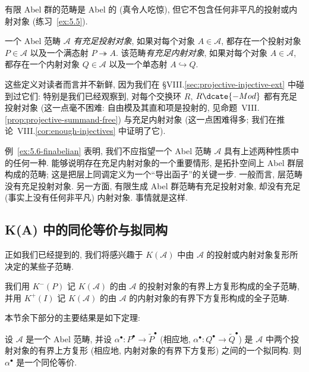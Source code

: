 \begin{example}\label{ex:5.6-finabelian}
有限 Abel 群的范畴是 Abel 的 (真令人吃惊), 但它不包含任何非平凡的投射或内射对象 (练习~\ref{ex:5.5}).
\end{example}

\begin{definition}\label{def:5.7-enough}
一个 Abel 范畴 $\mathcal{A}$ \emph{有充足投射对象}, 如果对每个对象 $A\in\mathcal{A}$, 都存在一个投射对象 $P\in\mathcal{A}$ 以及一个满态射 $P\twoheadrightarrow A$. 该范畴\emph{有充足内射对象}, 如果对每个对象 $A\in\mathcal{A}$, 都存在一个内射对象 $Q\in\mathcal{A}$ 以及一个单态射 $A\hookrightarrow Q$.
\end{definition}

\indent 这些定义对读者而言并不新鲜, 因为我们在 §VIII.\ref{sec:projective-injective-ext} 中碰到过它们: 特别是我们已经观察到, 对每个交换环 $R$, $R\dcate{-Mod}$ 都有充足投射对象 (这一点毫不困难: 自由模及其直和项是投射的, 见命题~VIII.\ref{prop:projective-summand-free}) 与充足内射对象 (这一点困难得多; 我们在推论~VIII.\ref{cor:enough-injectives} 中证明了它).

\indent 例~\ref{ex:5.6-finabelian} 表明, 我们不应指望一个 Abel 范畴 $\mathcal{A}$ 具有上述两种性质中的任何一种. 能够说明存在充足内射对象的一个重要情形, 是拓扑空间上 Abel 群层构成的范畴; 这是把层上同调定义为一个``导出函子''的关键一步. 一般而言, 层范畴没有充足投射对象. 另一方面, 有限生成 Abel 群范畴有充足投射对象, 却没有充足 (事实上没有任何非平凡) 内射对象. 事情就是这样.

\subsection{K(A) 中的同伦等价与拟同构}
\label{subsec:5.4-homotopy-quasi}

正如我们已经提到的, 我们将感兴趣于 $K(\mathcal{A})$ 中由 $\mathcal{A}$ 的投射或内射对象复形所决定的某些子范畴.

\begin{definition}\label{def:5.8-KP-KI}
我们用 $K^-(P)$ 记 $K(\mathcal{A})$ 的由 $\mathcal{A}$ 的投射对象的有界上方复形构成的全子范畴, 并用 $K^+(I)$ 记 $K(\mathcal{A})$ 的由 $\mathcal{A}$ 的内射对象的有界下方复形构成的全子范畴.
\end{definition}

\indent 本节余下部分的主要结果是如下定理:

\begin{theorem}\label{thm:5.9-quasi-is-homotopy-equiv}
设 $\mathcal{A}$ 是一个 Abel 范畴, 并设 $\alpha^\bullet:P^\bullet\to \widetilde{P}^\bullet$ (相应地, $\alpha^\bullet:Q^\bullet\to\widetilde{Q}^\bullet$) 是 $\mathcal{A}$ 中两个投射对象的有界上方复形 (相应地, 内射对象的有界下方复形) 之间的一个拟同构. 则 $\alpha^\bullet$ 是一个同伦等价.
\end{theorem}

